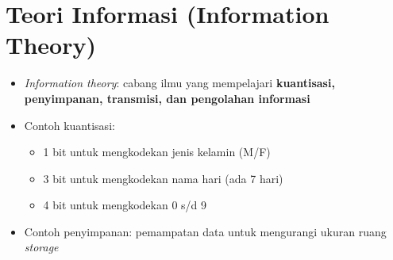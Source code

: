 \documentclass{article}
\begin{document}

\section*{Teori Informasi (Information Theory)}

\begin{itemize}
    \item \textit{Information theory}: cabang ilmu yang mempelajari \textbf{kuantisasi, penyimpanan, transmisi, dan pengolahan informasi}
    \item Contoh kuantisasi:
    \begin{itemize}
        \item 1 bit untuk mengkodekan jenis kelamin (M/F)
        \item 3 bit untuk mengkodekan nama hari (ada 7 hari)
        \item 4 bit untuk mengkodekan 0 s/d 9
    \end{itemize}
    \item Contoh penyimpanan: pemampatan data untuk mengurangi ukuran ruang \textit{storage}
\end{itemize}
\end{document}
